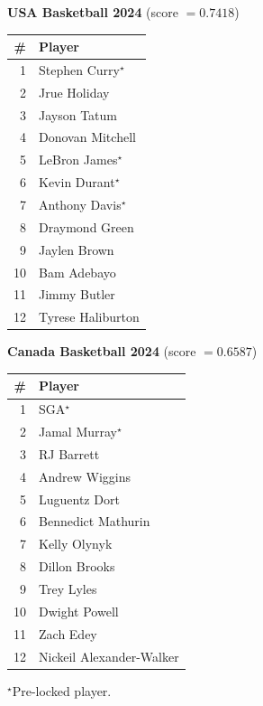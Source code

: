 \documentclass[11pt,letterpaper]{article}
\begin{document}
\vspace{0.3em}
\begin{center}
\small
\begin{minipage}{0.44\textwidth}
  \centering
  \textbf{USA Basketball 2024} \quad (score $= 0.7418$)\\[0.3em]
  \begin{tabular}{rl}
    \toprule
    \# & Player \\ \midrule
    1  & Stephen Curry$^{\star}$ \\
    2  & Jrue Holiday \\
    3  & Jayson Tatum \\
    4  & Donovan Mitchell \\
    5  & LeBron James$^{\star}$ \\
    6  & Kevin Durant$^{\star}$ \\
    7  & Anthony Davis$^{\star}$ \\
    8  & Draymond Green \\
    9  & Jaylen Brown \\
    10 & Bam Adebayo \\
    11 & Jimmy Butler \\
    12 & Tyrese Haliburton \\
    \bottomrule
  \end{tabular}
\end{minipage}%
\hfill
\begin{minipage}{0.44\textwidth}
  \centering
  \textbf{Canada Basketball 2024} \quad (score $= 0.6587$)\\[0.3em]
  \begin{tabular}{rl}
    \toprule
    \# & Player \\ \midrule
    1  & SGA$^{\star}$ \\
    2  & Jamal Murray$^{\star}$ \\
    3  & RJ Barrett \\
    4  & Andrew Wiggins \\
    5  & Luguentz Dort \\
    6  & Bennedict Mathurin \\
    7  & Kelly Olynyk \\
    8  & Dillon Brooks \\
    9  & Trey Lyles \\
    10 & Dwight Powell \\
    11 & Zach Edey \\
    12 & Nickeil Alexander-Walker \\
    \bottomrule
  \end{tabular}
\end{minipage}
\end{center}
{\footnotesize $^{\star}$Pre-locked player.}
\end{document}
